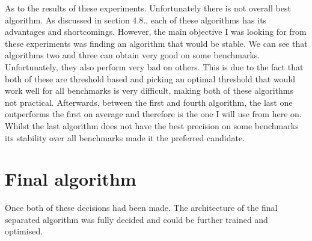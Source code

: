As to the results of these experiments. Unfortunately there is not overall best algorithm. As discussed in section 4.8., each of these algorithms has its advantages and shortcomings. However, the main objective I was looking for from these experiments was finding an algorithm that would be stable. We can see that algorithms two and three can obtain very good on some benchmarks. Unfortunately, they also perform very bad on others. This is due to the fact that both of these are threshold based and picking an optimal threshold that would work well for all benchmarks is very difficult, making both of these algorithms not practical. Afterwards, between the first and fourth algorithm, the last one outperforms the first on average and therefore is the one I will use from here on. Whilst the last algorithm does not have the best precision on some benchmarks its stability over all benchmarks made it the preferred candidate.
\section{Final algorithm}
Once both of these decisions had been made. The architecture of the final separated algorithm was fully decided and could be further trained and optimised.
































